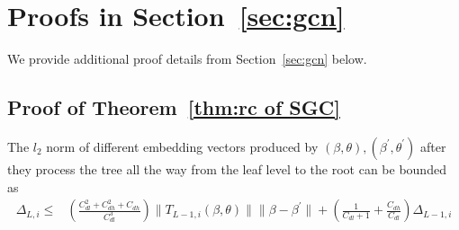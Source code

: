 \section{Proofs in Section~\ref{sec:gcn}}

We provide additional proof details from Section~\ref{sec:gcn} below. 

\subsection{Proof of Theorem~\ref{thm:rc of SGC}}\label{appendix:SGC}
\begin{lemma}
The $l_2$ norm of different embedding vectors produced by $(\beta, \theta), (\beta^\prime, \theta^\prime)$ after they process the tree all the way from the leaf level to the root can be bounded as 
\begin{align*}
    \Delta_{L, i} 
    \leq& \left(
    \frac{C_{dl}^2 + C_{dh}^2 + C_{dh}}{C_{dl}^3}
    \right)\|T_{L-1, i}(\beta, \theta)\| \|\beta - \beta^\prime\| + \left(\frac{1}{C_{dl}+1} + \frac{C_{dh}}{C_{dl}}\right)\Delta_{L-1, i}
\end{align*}
\end{lemma}

